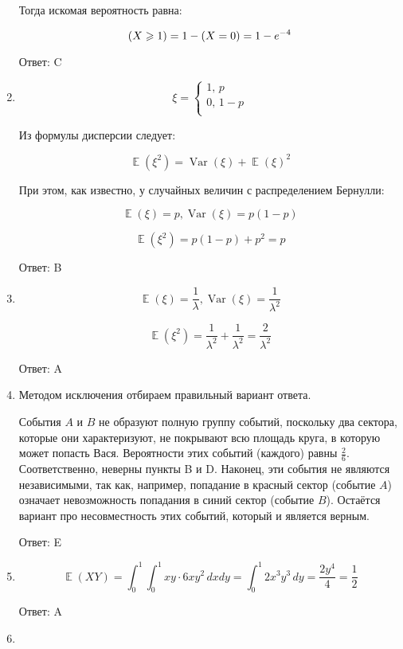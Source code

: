 \documentclass[11pt, a4paper]{article}
\DeclareMathOperator{\Var}{Var}
\DeclareMathOperator{\E}{\mathbb{E}}
\let\P\relax
\DeclareMathOperator{\P}{\mathbb{P}}
\renewcommand{\geq}{\geqslant}
\theoremstyle{definition}
\begin{document}
\begin{enumerate}
	Тогда искомая вероятность равна:
	
	\[
	\P(X\geq 1)=1-\P(X=0)=1-e^{-4}
	\]
	
	Ответ: C
	
	\item 
	
	\[
	\xi=\begin{cases}
	1 ,\, p\\
	0, \, 1-p\\
	\end{cases}
	\]
	
	Из формулы дисперсии следует:
	
	\[
	\E(\xi^2)=\Var(\xi)+\E(\xi)^2
	\]
	
	При этом, как известно, у случайных величин с распределением Бернулли:
	
	\[
	\E(\xi)=p, \Var(\xi)=p(1-p)
	\]
	
	\[
	\E(\xi^2)=p(1-p)+p^2=p
	\]
	
	Ответ: B
	
	\item 
	
	\[
	\E(\xi)=\frac{1}{\lambda}, \Var(\xi)=\frac{1}{\lambda^2}
	\]
	
	\[
	\E(\xi^2)=\frac{1}{\lambda^2}+\frac{1}{\lambda^2}=\frac{2}{\lambda^2}
	\]
	
	Ответ: A
	
	\item 
	
	Методом исключения отбираем правильный вариант ответа. 
	
	События $A$ и $B$ не образуют полную группу событий, поскольку два сектора, которые они характеризуют, не покрывают всю площадь круга, в которую может попасть Вася.
	Вероятности этих событий (каждого) равны $\frac{2}{6}$. 
	Соответственно, неверны пункты B и D. 
	Наконец, эти события не являются независимыми, так как, например, попадание в красный сектор (событие $A$) означает невозможность попадания в синий сектор (событие $B$).
	Остаётся вариант про несовместность этих событий, который и является верным.
	
	Ответ: E
	
	\item 
	
	\[
	\E(XY)=\int_{0}^{1}\int_{0}^{1} xy\cdot 6xy^2\,dxdy=\int_{0}^{1} 2x^3y^3\,dy=\frac{2y^4}{4}=\frac{1}{2}
	\]
	
	Ответ: A	
	
	\item 
	

\end{enumerate}
\end{document}
